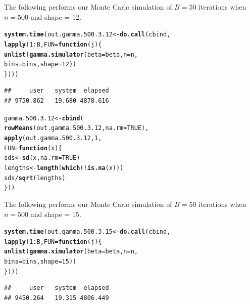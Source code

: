 \documentclass[11pt]{article}\usepackage[]{graphicx}\usepackage[]{color}
\makeatletter
\newcommand{\hlnum}[1]{\textcolor[rgb]{0.686,0.059,0.569}{#1}}%
\newcommand{\hlopt}[1]{\textcolor[rgb]{0,0,0}{#1}}%
\newcommand{\hlstd}[1]{\textcolor[rgb]{0.345,0.345,0.345}{#1}}%
\newcommand{\hlkwa}[1]{\textcolor[rgb]{0.161,0.373,0.58}{\textbf{#1}}}%
\newcommand{\hlkwb}[1]{\textcolor[rgb]{0.69,0.353,0.396}{#1}}%
\newcommand{\hlkwc}[1]{\textcolor[rgb]{0.333,0.667,0.333}{#1}}%
\newcommand{\hlkwd}[1]{\textcolor[rgb]{0.737,0.353,0.396}{\textbf{#1}}}%
\newenvironment{kframe}{%
 \def\at@end@of@kframe{}%
 \ifinner\ifhmode%
  \def\at@end@of@kframe{\end{minipage}}%
  \begin{minipage}{\columnwidth}%
 \fi\fi%
 \def\FrameCommand##1{\hskip\@totalleftmargin \hskip-\fboxsep
 \colorbox{shadecolor}{##1}\hskip-\fboxsep
     \hskip-\linewidth \hskip-\@totalleftmargin \hskip\columnwidth}%
 \MakeFramed {\advance\hsize-\width
   \@totalleftmargin\z@ \linewidth\hsize
   \@setminipage}}%
 {\par\unskip\endMakeFramed%
 \at@end@of@kframe}
\newenvironment{knitrout}{}{} %
\makeatother
\begin{document}
The following performs our Monte Carlo simulation of $B = 50$ iterations 
when $n = 500$ and shape = $12$.

\begin{knitrout}
\color{fgcolor}\begin{kframe}
\begin{alltt}
\hlkwd{system.time}\hlstd{(out.gamma.500.3.12} \hlkwb{<-} \hlkwd{do.call}\hlstd{(cbind,}
  \hlkwd{lapply}\hlstd{(}\hlnum{1}\hlopt{:}\hlstd{B,} \hlkwc{FUN} \hlstd{=} \hlkwa{function}\hlstd{(}\hlkwc{j}\hlstd{)\{}
    \hlkwd{unlist}\hlstd{(}\hlkwd{gamma.simulator}\hlstd{(}\hlkwc{beta} \hlstd{= beta,} \hlkwc{n} \hlstd{= n,}
      \hlkwc{bins} \hlstd{= bins,} \hlkwc{shape} \hlstd{=} \hlnum{12}\hlstd{))}
\hlstd{\})))}
\end{alltt}
\begin{verbatim}
##     user   system  elapsed 
## 9750.862   19.680 4878.616
\end{verbatim}
\end{kframe}
\end{knitrout}

\begin{knitrout}
\color{fgcolor}\begin{kframe}
\begin{alltt}
\hlstd{gamma.500.3.12} \hlkwb{<-} \hlkwd{cbind}\hlstd{(}
  \hlkwd{rowMeans}\hlstd{(out.gamma.500.3.12,} \hlkwc{na.rm} \hlstd{=} \hlnum{TRUE}\hlstd{),}
  \hlkwd{apply}\hlstd{(out.gamma.500.3.12,} \hlnum{1}\hlstd{,}
  \hlkwc{FUN} \hlstd{=} \hlkwa{function}\hlstd{(}\hlkwc{x}\hlstd{)\{}
    \hlstd{sds} \hlkwb{<-} \hlkwd{sd}\hlstd{(x,} \hlkwc{na.rm} \hlstd{=} \hlnum{TRUE}\hlstd{)}
    \hlstd{lengths} \hlkwb{<-} \hlkwd{length}\hlstd{(}\hlkwd{which}\hlstd{(}\hlopt{!}\hlkwd{is.na}\hlstd{(x)))}
    \hlstd{sds} \hlopt{/} \hlkwd{sqrt}\hlstd{(lengths)}
  \hlstd{\}))}
\end{alltt}
\end{kframe}
\end{knitrout}

The following performs our Monte Carlo simulation of $B = 50$ iterations 
when $n = 500$ and shape = $15$.

\begin{knitrout}
\color{fgcolor}\begin{kframe}
\begin{alltt}
\hlkwd{system.time}\hlstd{(out.gamma.500.3.15} \hlkwb{<-} \hlkwd{do.call}\hlstd{(cbind,}
  \hlkwd{lapply}\hlstd{(}\hlnum{1}\hlopt{:}\hlstd{B,} \hlkwc{FUN} \hlstd{=} \hlkwa{function}\hlstd{(}\hlkwc{j}\hlstd{)\{}
    \hlkwd{unlist}\hlstd{(}\hlkwd{gamma.simulator}\hlstd{(}\hlkwc{beta} \hlstd{= beta,} \hlkwc{n} \hlstd{= n,}
      \hlkwc{bins} \hlstd{= bins,} \hlkwc{shape} \hlstd{=} \hlnum{15}\hlstd{))}
\hlstd{\})))}
\end{alltt}
\begin{verbatim}
##     user   system  elapsed 
## 9450.264   19.315 4806.449
\end{verbatim}
\end{kframe}
\end{knitrout}
\end{document}
